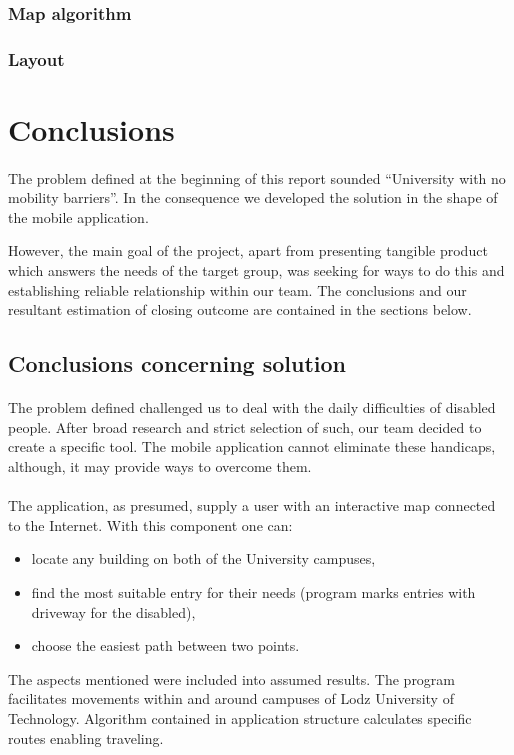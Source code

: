 \documentclass[12pt]{article}
\begin{document}
\subsubsection{Map algorithm}
\subsubsection{Layout}

\section{Conclusions}
\paragraph{}
The problem defined at the beginning of this report sounded ``University with no mobility barriers''.
In the consequence we developed the solution in the shape of the mobile application.

However, the main goal of the project, apart from presenting tangible product which answers the needs of the target group, was seeking for ways to do this and establishing reliable relationship within our team.
The conclusions and our resultant estimation of closing outcome are contained in the sections below.

\subsection{Conclusions concerning solution}
\paragraph{}
The problem defined challenged us to deal with the daily difficulties of disabled people.
After broad research and strict selection of such, our team decided to create a specific tool.
The mobile application cannot eliminate these handicaps, although, it may provide ways to overcome them.

\paragraph{}
The application, as presumed, supply a user with an interactive map connected to the Internet.
With this component one can:
\begin{itemize}
	\item locate any building on both of the University campuses,
	\item find the most suitable entry for their needs (program marks entries with driveway for the disabled),
	\item choose the easiest path between two points.
\end{itemize}
The aspects mentioned were included into assumed results.
The program facilitates movements within and around campuses of Lodz University of Technology.
Algorithm contained in application structure calculates specific routes enabling traveling.
\end{document}

